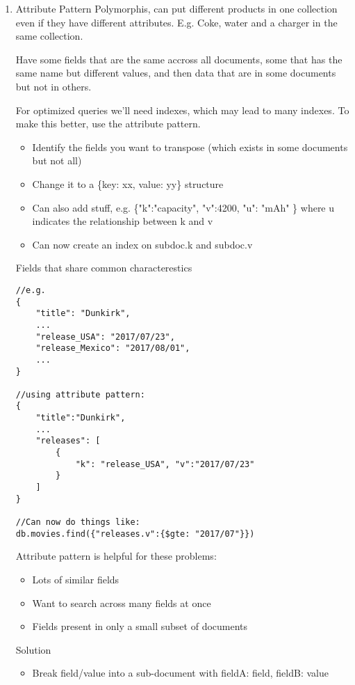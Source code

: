 \documentclass[11pt]{article}
\begin{document}
\begin{enumerate}
\item Attribute Pattern
\label{sec:orgad99981}
Polymorphis, can put different products in one collection even if they have different attributes. E.g. Coke, water and a charger in the same collection.

Have some fields that are the same accross all documents, some that has the same name but different values, and then data that are in some documents but not in others.

For optimized queries we'll need indexes, which may lead to many indexes. To make this better, use the attribute pattern.

\begin{itemize}
\item Identify the fields you want to transpose (which exists in some documents but not all)
\item Change it to a \{key: xx, value: yy\} structure
\item Can also add stuff, e.g. \{"k":"capacity", "v":4200, "u": "mAh" \} where u indicates the relationship between k and v
\item Can now create an index on subdoc.k and subdoc.v
\end{itemize}

Fields that share common characterestics
\begin{verbatim}
//e.g.
{
    "title": "Dunkirk",
    ...
    "release_USA": "2017/07/23",
    "release_Mexico": "2017/08/01",
    ...       
}

//using attribute pattern:
{
    "title":"Dunkirk",
    ...
    "releases": [
        {
            "k": "release_USA", "v":"2017/07/23"
        }
    ]
}

//Can now do things like:
db.movies.find({"releases.v":{$gte: "2017/07"}})
\end{verbatim}

Attribute pattern is helpful for these problems:
\begin{itemize}
\item Lots of similar fields
\item Want to search across many fields at once
\item Fields present in only a small subset of documents
\end{itemize}

Solution
\begin{itemize}
\item Break field/value into a sub-document with fieldA: field, fieldB: value
\end{itemize}


\end{enumerate}
\end{document}
